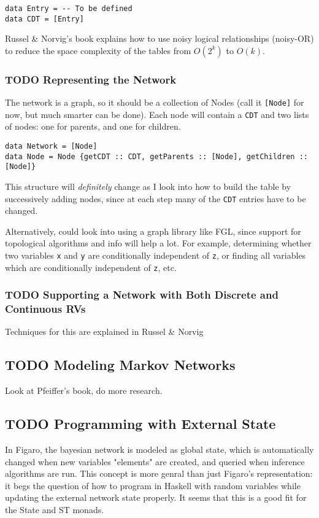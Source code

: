 \documentclass[11pt]{article}
\begin{document}
\begin{center}
\texttt{data Entry = -{}- To be defined} \\
      \texttt{data CDT = [Entry]}
\end{center}

Russel \& Norvig's book explains how to use noisy logical
relationships (noisy-OR) to reduce the space complexity of the tables
from $O(2^k)$ to $O(k)$. 

\subsubsection{{\bfseries\sffamily TODO} Representing the Network}
\label{sec-2-2-2}
The network is a graph, so it should be a collection of Nodes
(call it \texttt{[Node]} for now, but much smarter can be done). Each
node will contain a \texttt{CDT} and two lists of nodes: one for
parents, and one for children.
\begin{center}
\texttt{data Network = [Node]} \\
      \texttt{data Node = Node \{getCDT :: CDT, getParents :: [Node], getChildren :: [Node]\}}
\end{center}

This structure will \emph{definitely} change as I look into how to
build the table by successively adding nodes, since at each step
many of the \texttt{CDT} entries have to be changed. 

Alternatively, could look into using a graph library like FGL,
since support for topological algorithms and info will help a
lot. For example, determining whether two variables \texttt{x} and \texttt{y}
are conditionally independent of \texttt{z}, or finding all variables
which are conditionally independent of \texttt{z}, etc.

\subsubsection{{\bfseries\sffamily TODO} Supporting a Network with Both Discrete and Continuous RVs}
\label{sec-2-2-3}
Techniques for this are explained in Russel \& Norvig

\subsection{{\bfseries\sffamily TODO} Modeling Markov Networks}
\label{sec-2-3}
Look at Pfeiffer's book, do more research.

\subsection{{\bfseries\sffamily TODO} Programming with External State}
\label{sec-2-4}
In Figaro, the bayesian network is modeled as global state, which 
is automatically changed when new variables "elements" are created,
and queried when inference algorithms are run. This concept is more
genral than just Figaro's representation: it begs the question of
how to program in Haskell with random variables while updating
the external network state properly. It seems that this is a good
fit for the State and ST monads.
\end{document}
